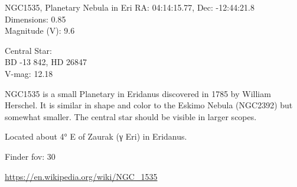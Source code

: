 \begin{block}{NGC1535, Planetary Nebula in Eri}
    RA: 04:14:15.77, Dec: -12:44:21.8 \\ 
    Dimensions: 0.85 \\ 
    Magnitude (V): 9.6

    Central Star: \\ 
      \hspace{1em}BD -13 842, HD 26847 \\ 
      \hspace{1em}V-mag: 12.18 

    NGC1535 is a small Planetary in Eridanus discovered in 1785 by William
    Herschel. It is similar in shape and color to the Eskimo Nebula (NGC2392)
    but somewhat smaller. The central star should be visible in larger scopes.

    Located about 4° E of Zaurak (γ Eri) in Eridanus.


    Finder fov: 30 

    \url{https://en.wikipedia.org/wiki/NGC_1535} 
\end{block}
